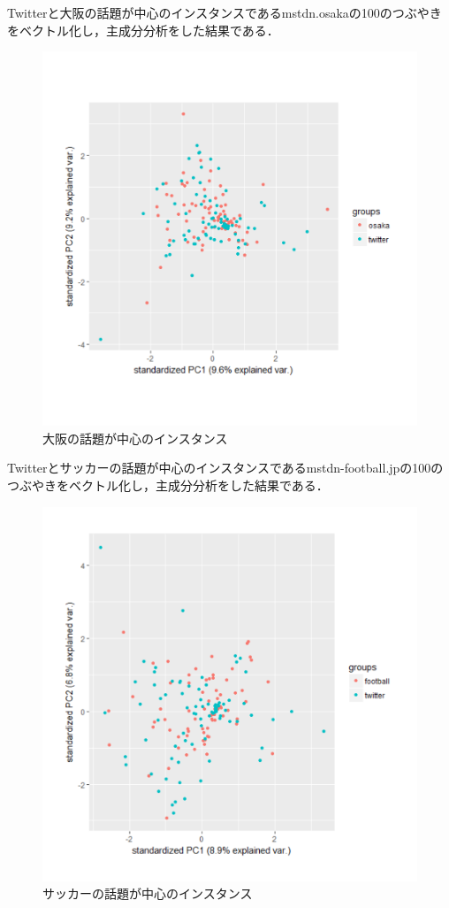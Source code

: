 Twitterと大阪の話題が中心のインスタンスであるmstdn.osakaの100のつぶやきをベクトル化し，主成分分析をした結果である．
\begin{figure}[h]
\centering
\includegraphics[width=13cm,clip]{osaka.pdf}
\caption{大阪の話題が中心のインスタンス}\label{osaka}
\end{figure}
\newpage

Twitterとサッカーの話題が中心のインスタンスであるmstdn-football.jpの100のつぶやきをベクトル化し，主成分分析をした結果である．
\begin{figure}[h]
\centering
\includegraphics[width=13cm,clip]{football.pdf}
\caption{サッカーの話題が中心のインスタンス}\label{football}
\end{figure}
\newpage

